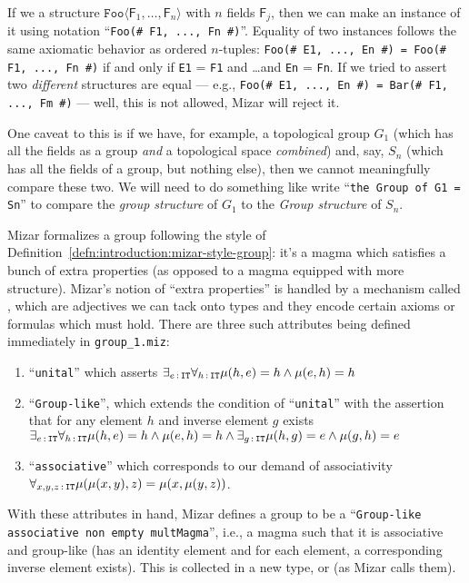 If we a structure $\mathtt{Foo} \langle \mathsf{F}_{1},\dots,\mathsf{F}_{n}\rangle$
with $n$ fields $\mathsf{F}_{j}$, then we can make an instance of it
using notation ``\verb$Foo(# F1, ..., Fn #)$''. Equality of two
instances follows the same axiomatic behavior as ordered $n$-tuples:
\verb$Foo(# E1, ..., En #) = Foo(# F1, ..., Fn #)$ if and only if
\verb#E1# = \verb#F1# and \dots and \verb#En# = \verb#Fn#. If we tried
to assert two \emph{different} structures are equal --- e.g.,
\verb$Foo(# E1, ..., En #) = Bar(# F1, ..., Fm #)$ --- well, this is not
allowed, Mizar will reject it.

One caveat to this is if we have, for example, a topological group
$G_{1}$ (which has all the fields as a group \emph{and} a topological
space \emph{combined}) and, say, $S_{n}$ (which has all the fields of a
group, but nothing else), then we cannot meaningfully compare these
two. We will need to do something like write ``\verb#the Group of G1 = Sn#''
to compare the \emph{group structure} of $G_{1}$ to the \emph{Group structure}
of $S_{n}$.

Mizar formalizes a group following the style of
Definition~\ref{defn:introduction:mizar-style-group}: it's a magma which
satisfies a bunch of extra properties (as opposed to a magma equipped
with more structure). Mizar's notion of ``extra properties'' is handled
by a mechanism called , which
are adjectives we can tack onto types and they encode certain axioms or
formulas which must hold. There are three such attributes being defined
immediately in \texttt{group\_1.miz}:
\begin{enumerate}
\item ``\texttt{unital}'' which asserts
  $\exists_{e\mathop{:}\nolimits \mathtt{IT}}\forall_{h\mathop{:}\nolimits \mathtt{IT}} \mu(h,e)=h\land\mu(e,h)=h$
\item ``\texttt{Group-like}'',
  which extends the condition of ``\texttt{unital}'' with the assertion
  that for any element $h$ and inverse element $g$ exists
  $\exists_{e\mathop{:}\nolimits \mathtt{IT}}\forall_{h\mathop{:}\nolimits \mathtt{IT}} \mu(h,e)=h\land\mu(e,h)=h\land\exists_{g\mathop{:}\nolimits \mathtt{IT}}\mu(h,g)=e\land\mu(g,h)=e$
\item ``\texttt{associative}''
  which corresponds to our demand of associativity
  $\forall_{x,y,z\mathop{:}\nolimits \mathtt{IT}}\mu(\mu(x,y),z)=\mu(x,\mu(y,z))$.
\end{enumerate}
With these attributes in hand, Mizar defines a group to be a
``\texttt{Group-like associative non empty multMagma}'', i.e., a magma such
that it is associative and group-like (has an identity element and for
each element, a corresponding inverse element exists). This is collected
in a new type, or  (as Mizar calls them).


